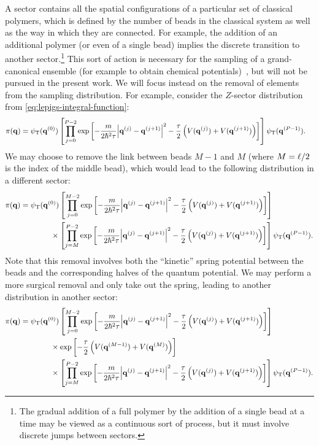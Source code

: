 A sector contains all the spatial configurations of a particular set of classical polymers, which is defined by the number of beads in the classical system as well as the way in which they are connected.
For example, the addition of an additional polymer (or even of a single bead) implies the discrete transition to another sector.\footnote{
	The gradual addition of a full polymer by the addition of a single bead at a time may be viewed as a continuous sort of process, but it must involve discrete jumps between sectors.
}
This sort of action is necessary for the sampling of a grand-canonical ensemble (for example to obtain chemical potentials)~\cite{herdman2014quantum}, but will not be pursued in the present work.
We will focus instead on the removal of elements from the sampling distribution.
For example, consider the $Z$-sector distribution from \cref{eq:lepigs-integral-function}:
\begin{align}
	\pi(\bm{\mathbf{q}})
	&= \psi_\mathrm{T}(\bm{\mathbf{q}}^{(0)})
		\left[ \prod_{j=0}^{P-2} \exp{\left[ 
			-\frac{m}{2 \hbar^2 \tau} \abs{\bm{\mathbf{q}}^{(j)} - \bm{\mathbf{q}}^{(j+1)}}^2
			- \frac{\tau}{2} \left( V(\bm{\mathbf{q}}^{(j)}) + V(\bm{\mathbf{q}}^{(j+1)}) \right)
		 \right]} \right]
		\psi_\mathrm{T}(\bm{\mathbf{q}}^{(P-1)}).
			\label{eq:ugly-distribution1}
\end{align}
We may choose to remove the link between beads $M-1$ and $M$ (where $M = \ell / 2$ is the index of the middle bead), which would lead to the following distribution in a different sector:
\begin{align}
	\pi(\bm{\mathbf{q}})
	&= \psi_\mathrm{T}(\bm{\mathbf{q}}^{(0)})
		\left[ \prod_{j=0}^{M-2} \exp{\left[ 
			-\frac{m}{2 \hbar^2 \tau} \abs{\bm{\mathbf{q}}^{(j)} - \bm{\mathbf{q}}^{(j+1)}}^2
			- \frac{\tau}{2} \left( V(\bm{\mathbf{q}}^{(j)}) + V(\bm{\mathbf{q}}^{(j+1)}) \right)
		 \right]} \right] \notag \\
	&\qquad\qquad\times
		\left[ \prod_{j=M}^{P-2} \exp{\left[ 
			-\frac{m}{2 \hbar^2 \tau} \abs{\bm{\mathbf{q}}^{(j)} - \bm{\mathbf{q}}^{(j+1)}}^2
			- \frac{\tau}{2} \left( V(\bm{\mathbf{q}}^{(j)}) + V(\bm{\mathbf{q}}^{(j+1)}) \right)
		 \right]} \right]
		\psi_\mathrm{T}(\bm{\mathbf{q}}^{(P-1)}).
			\label{eq:ugly-distribution2}
\end{align}
Note that this removal involves both the ``kinetic'' spring potential between the beads and the corresponding halves of the quantum potential.
We may perform a more surgical removal and only take out the spring, leading to another distribution in another sector:
\begin{align}
	\pi(\bm{\mathbf{q}})
	&= \psi_\mathrm{T}(\bm{\mathbf{q}}^{(0)})
		\left[ \prod_{j=0}^{M-2} \exp{\left[ 
			-\frac{m}{2 \hbar^2 \tau} \abs{\bm{\mathbf{q}}^{(j)} - \bm{\mathbf{q}}^{(j+1)}}^2
			- \frac{\tau}{2} \left( V(\bm{\mathbf{q}}^{(j)}) + V(\bm{\mathbf{q}}^{(j+1)}) \right)
		 \right]} \right] \notag \\
	&\qquad\qquad\times
		\exp{\left[ -\frac{\tau}{2} \left( V(\bm{\mathbf{q}}^{(M-1)}) + V(\bm{\mathbf{q}}^{(M)}) \right) \right]} \notag \\
	&\qquad\qquad\times
		\left[ \prod_{j=M}^{P-2} \exp{\left[ 
			-\frac{m}{2 \hbar^2 \tau} \abs{\bm{\mathbf{q}}^{(j)} - \bm{\mathbf{q}}^{(j+1)}}^2
			- \frac{\tau}{2} \left( V(\bm{\mathbf{q}}^{(j)}) + V(\bm{\mathbf{q}}^{(j+1)}) \right)
		 \right]} \right]
		\psi_\mathrm{T}(\bm{\mathbf{q}}^{(P-1)}).
			\label{eq:ugly-distribution3}
\end{align}

